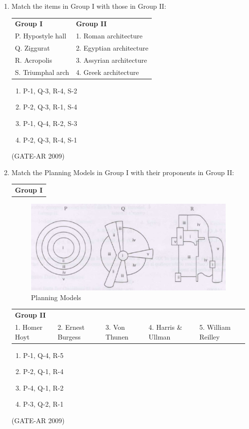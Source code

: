 \documentclass[a4paper,10pt]{article}
\begin{document}
\begin{enumerate}
    \item Match the items in Group I with those in Group II:  \\
    \begin{tabular}{ l l }
	\textbf{Group I} & \textbf{Group II} \\
	P. Hypostyle hall & 1. Roman architecture \\
	Q. Ziggurat & 2. Egyptian architecture \\
	R. Acropolis & 3. Assyrian architecture \\
	S. Triumphal arch & 4. Greek architecture \\
	\end{tabular}
	\begin{multicols}{2}
	\begin{enumerate}
        \item P-1, Q-3, R-4, S-2
        \item P-2, Q-3, R-1, S-4
        \item P-1, Q-4, R-2, S-3
        \item P-2, Q-3, R-4, S-1
    \end{enumerate}
	\end{multicols}
    \hfill (GATE-AR 2009)

    \item Match the Planning Models in Group I with their proponents in Group II:  \\
    \begin{tabular}{ l }
	\textbf{Group I} \\
	\end{tabular}
	\begin{figure}[h!]
        \centering
        \includegraphics[width=0.5\linewidth]{figs/03.jpg}
	\caption{Planning Models}
	\label{fig:Img03}
	\end{figure}
    \begin{tabular}{ l l l l l }
	\textbf{Group II} & & \\
	1. Homer Hoyt & 2. Ernest Burgess & 3. Von Thunen & 4. Harris \& Ullman & 5. William Reilley \\
	\end{tabular}
	\begin{multicols}{2}
	\begin{enumerate}
        \item P-1, Q-4, R-5
        \item P-2, Q-1, R-4
        \item P-4, Q-1, R-2
        \item P-3, Q-2, R-1
    \end{enumerate}
	\end{multicols}
    \hfill (GATE-AR 2009)


\end{enumerate}
\end{document}
